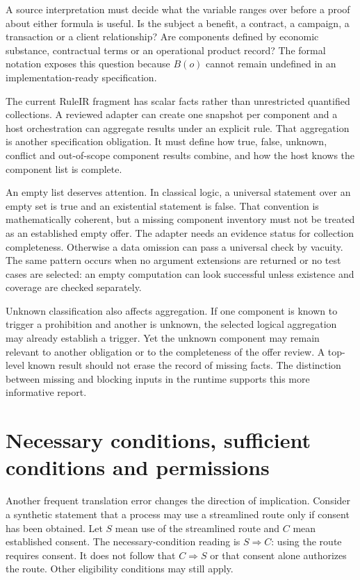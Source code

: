 
A source interpretation must decide what the variable ranges over before a proof
about either formula is useful. Is the subject a benefit, a contract, a campaign,
a transaction or a client relationship? Are components defined by economic
substance, contractual terms or an operational product record? The formal
notation exposes this question because $B(o)$ cannot remain undefined in an
implementation-ready specification.

The current RuleIR fragment has scalar facts rather than unrestricted quantified
collections. A reviewed adapter can create one snapshot per component and a host
orchestration can aggregate results under an explicit rule. That aggregation is
another specification obligation. It must define how true, false, unknown,
conflict and out-of-scope component results combine, and how the host knows the
component list is complete.

An empty list deserves attention. In classical logic, a universal statement over
an empty set is true and an existential statement is false. That convention is
mathematically coherent, but a missing component inventory must not be treated as
an established empty offer. The adapter needs an evidence status for collection
completeness. Otherwise a data omission can pass a universal check by vacuity.
The same pattern occurs when no argument extensions are returned or no test cases
are selected: an empty computation can look successful unless existence and
coverage are checked separately.

Unknown classification also affects aggregation. If one component is known to
trigger a prohibition and another is unknown, the selected logical aggregation
may already establish a trigger. Yet the unknown component may remain relevant
to another obligation or to the completeness of the offer review. A top-level
known result should not erase the record of missing facts. The distinction between
missing and blocking inputs in the runtime supports this more informative report.

\section{Necessary conditions, sufficient conditions and permissions}
\label{merge:M03:02}


Another frequent translation error changes the direction of implication. Consider
a synthetic statement that a process may use a streamlined route only if consent
has been obtained. Let $S$ mean use of the streamlined route and $C$ mean established
consent. The necessary-condition reading is $S\Rightarrow C$: using the route
requires consent. It does not follow that $C\Rightarrow S$ or that consent alone
authorizes the route. Other eligibility conditions may still apply.


